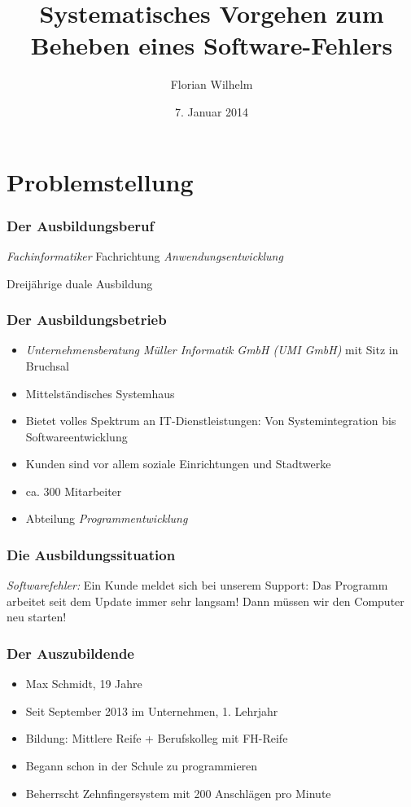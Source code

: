 \documentclass{beamer}
\title[]{Systematisches Vorgehen zum Beheben eines Software-Fehlers}
\author{Florian Wilhelm}
\date{7. Januar 2014}
\begin{document}
\frame{
	\titlepage
}


\section{Problemstellung}

\setcounter{subsection}{1}
\begin{frame} 
  \frametitle{Der Ausbildungsberuf}
    \emph{Fachinformatiker} Fachrichtung \emph{Anwendungsentwicklung}
    
    Dreijährige duale Ausbildung
\end{frame}

\setcounter{subsection}{1}
\begin{frame}
  \frametitle{Der Ausbildungsbetrieb}
   \begin{itemize}
    \item{\emph{Unternehmensberatung Müller Informatik GmbH (UMI GmbH)} mit Sitz in Bruchsal}
    \item{Mittelständisches Systemhaus}
    \item{Bietet volles Spektrum an IT-Dienstleistungen: Von Systemintegration bis Softwareentwicklung}
    \item{Kunden sind vor allem soziale Einrichtungen und Stadtwerke}
    \item{ca. 300 Mitarbeiter}
    \item{Abteilung \emph{Programmentwicklung}}
   \end{itemize}
\end{frame}

\setcounter{subsection}{1}
\begin{frame} 
  \frametitle{Die Ausbildungssituation}
    \emph{Softwarefehler:}
    \leavevmode\hphantom{ } %
    Ein Kunde meldet sich bei unserem Support: \glqq Das Programm arbeitet seit dem Update immer sehr langsam! Dann müssen wir den Computer neu starten!\grqq{}
\end{frame}

\setcounter{subsection}{1}
\begin{frame}
  \frametitle{Der Auszubildende}
   \begin{itemize}
    \item{Max Schmidt, 19 Jahre}
    \item{Seit September 2013 im Unternehmen, 1. Lehrjahr}
    \item{Bildung: Mittlere Reife + Berufskolleg mit FH-Reife}
    \item{Begann schon in der Schule zu programmieren}
    \item{Beherrscht Zehnfingersystem mit 200 Anschlägen pro Minute}
   \end{itemize}
\end{frame}
\end{document}
